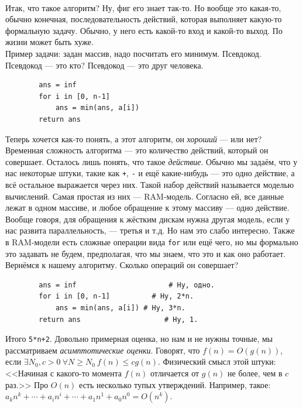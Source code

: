 \documentclass{article}
\newcommand{\pseudo}{PseudoLexer.py:PseudoLexer -x}
\newcommand{\pseudocode}[1]{\texttt{#1}}
\begin{document}
    \paragraph{}
    Итак, что такое алгоритм? Ну, фиг его знает так-то. Но вообще это какая-то, обычно конечная, последовательность действий, которая выполняет какую-то формальную задачу.
    Обычно, у него есть какой-то вход и какой-то выход. По жизни может быть хуже.\\
    Пример задачи: задан массив, надо посчитать его минимум. Псевдокод. Псевдокод --- это кто? Псевдокод --- это друг человека.
    \begin{verbatim}
        ans = inf
        for i in [0, n-1]
            ans = min(ans, a[i])
        return ans
    \end{verbatim}
    Теперь хочется как-то понять, а этот алгоритм, он \textit{хороший} --- или нет?\\
    Временная сложность алгоритма --- это количество действий, который он совершает. Осталось лишь понять, что такое \textit{действие}. Обычно мы задаём, что у нас некоторые штуки, такие как \pseudocode{+}, \pseudocode{-} и ещё какие-нибудь --- это одно действие, а всё остальное выражается через них. Такой набор действий называется моделью вычислений. Самая простая из них --- RAM-модель. Согласно ей, все данные лежат в одном массиве, и любое обращение к этому массиву --- одно действие. Вообще говоря, для обращения к жёстким дискам нужна другая модель, если у нас развита параллельность, --- третья и т.д. Но нам это слабо интересно. Также в RAM-модели есть сложные операции вида \pseudocode{for} или ещё чего, но мы формально это задавать не будем, предполагая, что мы знаем, что это и как оно работает.\\
    Вернёмся к нашему алгоритму. Сколько операций он совершает?
    \begin{verbatim}
        ans = inf                      # Ну, одно.
        for i in [0, n-1]          # Ну, 2*n.
            ans = min(ans, a[i]) # Ну, 3*n.
        return ans                    # Ну, 1.
    \end{verbatim}
    Итого \pseudocode{5*n+2}. Довольно примерная оценка, но нам и не нужны точные, мы рассматриваем \textit{асимптотические оценки}. Говорят, что $f(n)=O(g(n))$, если $\exists N_0,c>0~\forall N\geqslant N_0~f(n)\leqslant cg(n)$. Физический смысл этой штуки: <<Начиная с какого-то момента $f(n)$ отличается от $g(n)$ не более, чем в $c$ раз.>> Про $O(n)$ есть несколько тупых утверждений. Например, такое: $a_kn^k+\cdots+a_in^i+\cdots+a_1n^1+a_0n^0=O(n^k)$.\\
\end{document}
